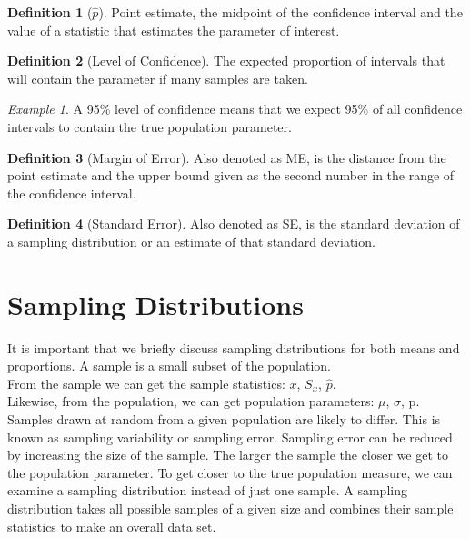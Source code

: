 \documentclass{article}
\theoremstyle{definition}
\newtheorem{definition}{Definition}[section]
\theoremstyle{remark}
\newtheorem{exmp}{Example}[section]
\begin{document}
\begin{definition}[$\hat{p}$]
  Point estimate, the midpoint of the confidence interval and the value of a statistic that estimates
  the parameter of interest.
\end{definition}

\begin{definition}[Level of Confidence]
  The expected proportion of intervals that will contain the parameter if many samples are taken.\\
  \begin{exmp}
    A 95\% level of confidence means that we expect 95\% of all confidence intervals to contain the true
    population parameter.
  \end{exmp}
\end{definition}

\begin{definition}[Margin of Error]
  Also denoted as ME, is the distance from the point estimate and the upper bound given as the second number
  in the range of the confidence interval.
\end{definition}

\begin{definition}[Standard Error] \label{standerr}
  Also denoted as SE, is the standard deviation of a sampling distribution or an estimate of that standard deviation.
\end{definition}

\section{Sampling Distributions}

It is important that we briefly discuss sampling distributions for both means and proportions. A sample is a small subset of the population. \\
From the sample we can get the sample statistics: $\bar{x}$, $S_x$, $\hat{p}$. \\ 
Likewise, from the population, we can get population parameters: $\mu$, $\sigma$, p. \\
Samples drawn at random from a given population are likely to differ. This is known as sampling variability or sampling error. 
Sampling error can be reduced by increasing the size of the sample. The larger the sample the closer we get to the population parameter.
To get closer to the true population measure, we can examine a sampling distribution instead of just one sample. A sampling distribution
takes all possible samples of a given size and combines their sample statistics to make an overall data set.
\end{document}
